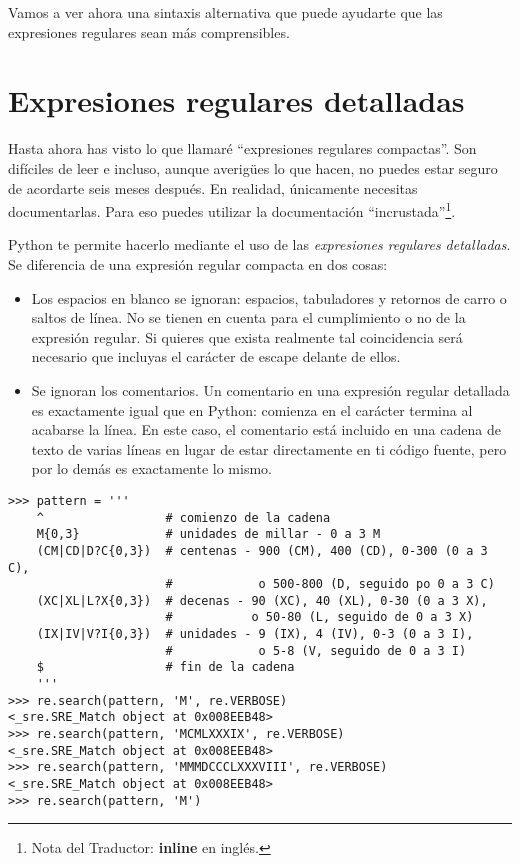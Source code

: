 Vamos a ver ahora una sintaxis alternativa que puede ayudarte que las expresiones regulares sean más comprensibles.

\section{Expresiones regulares detalladas}

Hasta ahora has visto lo que llamaré ``expresiones regulares compactas''. Son difíciles de leer e incluso, aunque averigües lo que hacen, no puedes estar seguro de acordarte seis meses después. En realidad, únicamente necesitas documentarlas. Para eso puedes utilizar la documentación ``incrustada''\footnote{Nota del Traductor: \textbf{inline} en inglés.}.

Python te permite hacerlo mediante el uso de las \emph{expresiones regulares detalladas}. Se diferencia de una expresión regular compacta en dos cosas:

\begin{itemize}

\item Los espacios en blanco se ignoran: espacios, tabuladores y retornos de carro o saltos de línea. No se tienen en cuenta para el cumplimiento o no de la expresión regular. Si quieres que exista realmente tal coincidencia será necesario que incluyas el carácter de escape delante de ellos.

\item Se ignoran los comentarios. Un comentario en una expresión regular detallada es exactamente igual que en Python: comienza en el carácter \codigo{\#} termina al acabarse la línea. En este caso, el comentario está incluido en una cadena de texto de varias líneas en lugar de estar directamente en ti código fuente, pero por lo demás es exactamente lo mismo.

\end{itemize}

\noindent\begin{minipage}{\textwidth}
\begin{lstlisting}[mathescape=False]
>>> pattern = '''
    ^                 # comienzo de la cadena
    M{0,3}            # unidades de millar - 0 a 3 M
    (CM|CD|D?C{0,3})  # centenas - 900 (CM), 400 (CD), 0-300 (0 a 3 C),
                      #            o 500-800 (D, seguido po 0 a 3 C)
    (XC|XL|L?X{0,3})  # decenas - 90 (XC), 40 (XL), 0-30 (0 a 3 X),
                      #           o 50-80 (L, seguido de 0 a 3 X)
    (IX|IV|V?I{0,3})  # unidades - 9 (IX), 4 (IV), 0-3 (0 a 3 I),
                      #            o 5-8 (V, seguido de 0 a 3 I)
    $                 # fin de la cadena
    '''
>>> re.search(pattern, 'M', re.VERBOSE)
<_sre.SRE_Match object at 0x008EEB48>
>>> re.search(pattern, 'MCMLXXXIX', re.VERBOSE)
<_sre.SRE_Match object at 0x008EEB48>
>>> re.search(pattern, 'MMMDCCCLXXXVIII', re.VERBOSE)
<_sre.SRE_Match object at 0x008EEB48>
>>> re.search(pattern, 'M')
\end{lstlisting}
\end{minipage}

